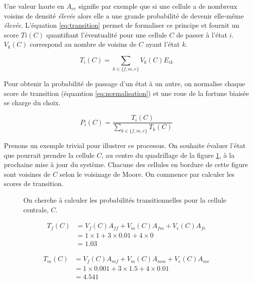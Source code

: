 \documentclass[12pt]{article}
\begin{document}
Une valeur haute en $A_{ee}$ signifie par exemple que si une cellule a
de nombreux voisins de densité \textit{élevée} alors elle a une grande
probabilité de devenir elle-même \textit{élevée}. L'équation
\ref{eq:transition} permet de formaliser ce principe et fournit un
score $Ti(C)$ quantifiant l'éventualité pour une cellule $C$ de passer
à l'état $i$. $V_k(C)$ correspond au nombre de voisins de $C$ ayant
l'état $k$.

\begin{equation}
T_i(C) = \sum_{k \in \{f,m,e\}} V_k(C) E_{ik}
\label{eq:transition}
\end{equation}

Pour obtenir la probabilité de passage d'un état à un autre, on
normalise chaque score de transition (équantion
\ref{eq:normalisation}) et une roue de la fortune biaisée se charge du
choix.

\begin{equation}
P_i(C) = \frac{T_i(C)}{\sum_{k \in \{f,m,e\}} T_k(C)}
\label{eq:normalisation}
\end{equation}

Prenons un exemple trivial pour illustrer ce processus. On souhaite
évaluer l'état que pourrait prendre la cellule $C$, au centre du
quadrillage de la figure \ref{fig:ca-example}, à la prochaine mise à
jour du système. Chacune des cellules en bordure de cette figure sont
voisines de $C$ selon le voisinage de Moore. On commence par calculer
les scores de transition.

\begin{figure}[!ht]
  \centering
  
  \caption{On cherche à calculer les probabilités transitionnelles
    pour la cellule centrale, $C$.}
  \label{fig:ca-example}
\end{figure}

\begin{align*}
T_f(C) &= V_f(C) A_{ff} + V_m(C) A_{fm} + V_e(C) A_{fe} \\
       &= 1 \times 1 + 3 \times 0.01 + 4 \times 0 \\
       &= 1.03
\end{align*}

\begin{align*}
T_m(C) &= V_f(C) A_{mf} + V_m(C) A_{mm} + V_e(C) A_{me} \\
       &= 1 \times 0.001 + 3 \times 1.5 + 4 \times 0.01 \\
       &= 4.541
\end{align*}
\end{document}
